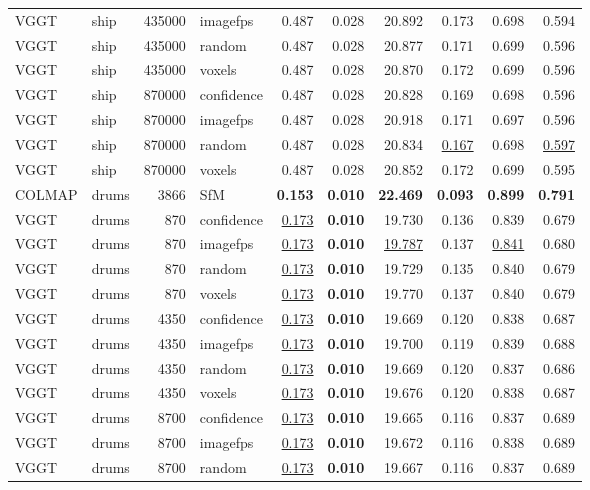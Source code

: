 \begin{table}[H]
\begin{tabular}{llrlrrrrrr}
VGGT & ship & 435000 & imagefps & 0.487 & 0.028 & 20.892 & 0.173 & 0.698 & 0.594 \\
VGGT & ship & 435000 & random & 0.487 & 0.028 & 20.877 & 0.171 & 0.699 & 0.596 \\
VGGT & ship & 435000 & voxels & 0.487 & 0.028 & 20.870 & 0.172 & 0.699 & 0.596 \\
VGGT & ship & 870000 & confidence & 0.487 & 0.028 & 20.828 & 0.169 & 0.698 & 0.596 \\
VGGT & ship & 870000 & imagefps & 0.487 & 0.028 & 20.918 & 0.171 & 0.697 & 0.596 \\
VGGT & ship & 870000 & random & 0.487 & 0.028 & 20.834 & \underline{0.167} & 0.698 & \underline{0.597} \\
VGGT & ship & 870000 & voxels & 0.487 & 0.028 & 20.852 & 0.172 & 0.699 & 0.595 \\
\midrule
COLMAP & drums & 3866 & SfM & \textbf{0.153} & \textbf{0.010} & \textbf{22.469} & \textbf{0.093} & \textbf{0.899} & \textbf{0.791} \\
VGGT & drums & 870 & confidence & \underline{0.173} & \textbf{0.010} & 19.730 & 0.136 & 0.839 & 0.679 \\
VGGT & drums & 870 & imagefps & \underline{0.173} & \textbf{0.010} & \underline{19.787} & 0.137 & \underline{0.841} & 0.680 \\
VGGT & drums & 870 & random & \underline{0.173} & \textbf{0.010} & 19.729 & 0.135 & 0.840 & 0.679 \\
VGGT & drums & 870 & voxels & \underline{0.173} & \textbf{0.010} & 19.770 & 0.137 & 0.840 & 0.679 \\
VGGT & drums & 4350 & confidence & \underline{0.173} & \textbf{0.010} & 19.669 & 0.120 & 0.838 & 0.687 \\
VGGT & drums & 4350 & imagefps & \underline{0.173} & \textbf{0.010} & 19.700 & 0.119 & 0.839 & 0.688 \\
VGGT & drums & 4350 & random & \underline{0.173} & \textbf{0.010} & 19.669 & 0.120 & 0.837 & 0.686 \\
VGGT & drums & 4350 & voxels & \underline{0.173} & \textbf{0.010} & 19.676 & 0.120 & 0.838 & 0.687 \\
VGGT & drums & 8700 & confidence & \underline{0.173} & \textbf{0.010} & 19.665 & 0.116 & 0.837 & 0.689 \\
VGGT & drums & 8700 & imagefps & \underline{0.173} & \textbf{0.010} & 19.672 & 0.116 & 0.838 & 0.689 \\
VGGT & drums & 8700 & random & \underline{0.173} & \textbf{0.010} & 19.667 & 0.116 & 0.837 & 0.689 \\

\end{tabular}
\end{table}
